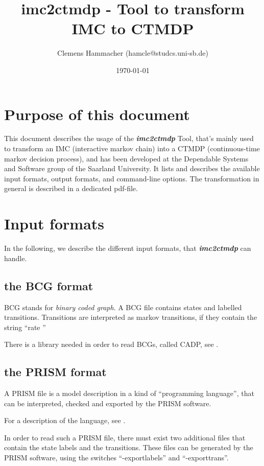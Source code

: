 \documentclass[a4paper,11pt]{scrartcl}
\title{imc2ctmdp - Tool to transform IMC to CTMDP}
\author{Clemens Hammacher (hamcle@studcs.uni-sb.de)}
\date{\today}
\newcommand{\imcToCtmdp}{\textbf{\textit{imc2ctmdp}} }
\begin{document}
\maketitle
\tableofcontents
\newpage

\section{Purpose of this document}
This document describes the usage of the \imcToCtmdp Tool, that's mainly used
to transform an IMC (interactive markov chain) into a CTMDP (continuous-time
markov decision process), and has been developed at the Dependable Systems
and Software group\cite{depend-group} of the Saarland University.
It lists and describes the available input formats,
output formats, and command-line options. The transformation in general is
described in a dedicated pdf-file\cite{paper-transformation}.


\section{Input formats}

In the following, we describe the different input formats, that \imcToCtmdp can
handle.

\subsection{the BCG format}\label{input-bcg}

BCG stands for \textit{binary coded graph}. A BCG file contains states and
labelled transitions.
Transitions are interpreted as markov transitions, if they contain the string
``rate ''

There is a library needed in order to read BCGs, called CADP,
see \cite{bcg-page}.

\subsection{the PRISM format}\label{input-prism}

A PRISM file is a model description in a kind of ``programming language'', that
can be interpreted, checked and exported by the PRISM software.

For a description of the language, see \cite{prism-page}.

In order to read such a PRISM file, there must exist two additional files
that contain the state labels and the transitions. These files can be generated
by the PRISM software, using the switches ``-exportlabels'' and
``-exporttrans''.
\end{document}
